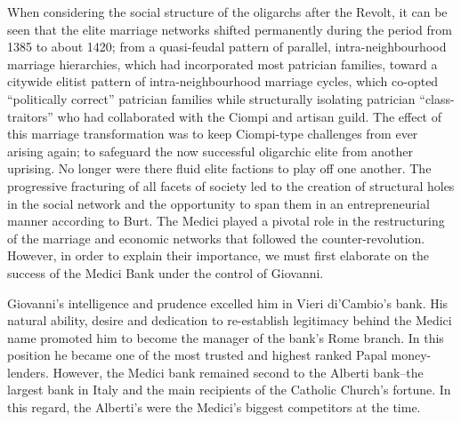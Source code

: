 When considering the social structure of the oligarchs after the Revolt, it can be seen that the elite marriage networks shifted permanently during the period from 1385 to about 1420; from a quasi-feudal pattern of parallel, intra-neighbourhood marriage hierarchies, which had incorporated most patrician families, toward a citywide elitist pattern of intra-neighbourhood marriage cycles, which co-opted ``politically correct'' patrician families while structurally isolating patrician ``class-traitors'' who had collaborated with the Ciompi and artisan guild. The effect of this marriage transformation was to keep Ciompi-type challenges from ever arising again; to safeguard the now successful oligarchic elite from another uprising. No longer were there fluid elite factions to play off one another. The progressive fracturing of all facets of society led to the creation of structural holes in the social network and the opportunity to span them in an entrepreneurial manner according to Burt. The Medici played a pivotal role in the restructuring of the marriage and economic networks that followed the counter-revolution. However, in order to explain their importance, we must first elaborate on the success of the Medici Bank under the control of Giovanni.

Giovanni's intelligence and prudence excelled him in Vieri di'Cambio's bank. His natural ability, desire and dedication to re-establish legitimacy behind the Medici name promoted him to become the manager of the bank's Rome branch. In this position he became one of the most trusted and highest ranked Papal money-lenders. However, the Medici bank remained second to the Alberti bank--the largest bank in Italy and the main recipients of the Catholic Church's fortune. In this regard, the Alberti's were the Medici's biggest competitors at the time.

